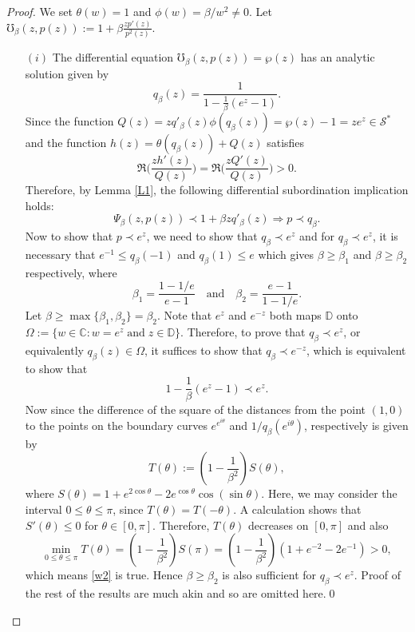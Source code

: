 \documentclass[12pt, reqno]{amsart}
\numberwithin{equation}{section}
\theoremstyle{plain}
\theoremstyle{definition}
\theoremstyle{remark}
\begin{document}
\begin{proof}
	We set $\theta(w)=1$ and $\phi(w)=\beta/{w}^2\neq0$. Let
	$\mho_\beta(z, p(z)):=1+\beta \frac{zp'(z)}{p^2(z)}$.
	\begin{itemize}
		\item [$(i)$] The differential equation $\mho_\beta(z, p(z))=\wp(z)$ has an analytic solution given by
		\begin{equation*}
		q_{\beta}(z)=\frac{1}{1-\frac{1}{\beta}(e^z-1)}.
		\end{equation*}
		Since the function 
		$Q(z)=zq'_{\beta}(z)\phi(q_{\beta}(z))=\wp(z)-1=ze^z\in\mathcal{S}^{*}$ and the function	$h(z)=\theta(q_{\beta}(z))+Q(z)$ satisfies  
		$$\Re\biggl(\frac{zh'(z)}{Q(z)}\biggl)=\Re\biggl(\frac{zQ'(z)}{Q(z)}\biggl)>0.$$ 
		Therefore, by Lemma \ref{L1}, the following differential subordination implication holds:
		$$\Psi_\beta(z, p(z))\prec 1+\beta zq'_{\beta}(z)\Rightarrow p\prec q_{\beta}.$$
		Now to show that $p\prec e^z$, we need to show that $q_{\beta}\prec e^z$ and for $q_{\beta}\prec e^z$, it is necessary that $e^{-1}\leq q_{\beta}(-1)$ and $q_{\beta}(1)\leq e$ which gives $\beta\geq\beta_1$ and $\beta\geq\beta_2$ respectively, where
		$$\beta_1=\frac{1-1/e}{e-1} \quad\text{and}\quad \beta_2=\frac{e-1}{1-1/e}.$$
		Let $\beta\geq\max\{\beta_1,\beta_2\}=\beta_2$. Note that $e^z$ and $e^{-z}$ both maps $\mathbb{D}$ onto $\Omega:=\{w\in \mathbb{C}: w=e^z \;\text{and}\; z\in\mathbb{D} \}$. Therefore, to prove that $q_{\beta} \prec e^z$, or equivalently $q_{\beta}(z) \in \Omega$, it suffices to show that $q_{\beta} \prec e^{-z}$, which is equivalent to show that 
		\begin{equation}\label{w2}
		1-\frac{1}{\beta}(e^z-1) \prec e^z.
		\end{equation}  
		Now since the difference of the square of the distances from the point $(1,0)$ to the points on the boundary curves  $e^{e^{i\theta}}$ and $1/q_{\beta}( e^{i\theta})$, respectively is given by
		$$T(\theta):=\left(1-\frac{1}{{\beta}^2}\right)S(\theta), $$
		where $S(\theta)=1+e^{2\cos\theta}-2e^{\cos\theta}\cos(\sin\theta).$  
		Here, we may consider the interval $0\leq\theta\leq\pi$, since $T(\theta)=T(-\theta)$.
		A calculation shows that $S'(\theta)\leq0$ for $\theta\in[0,\pi]$. Therefore, $T(\theta)$ decreases on $[0,\pi]$ and also $$\min_{0\leq\theta\leq\pi}T(\theta)=\left(1-\frac{1}{{\beta}^2}\right)S(\pi)=\left(1-\frac{1}{{\beta}^2}\right)(1+e^{-2}-2e^{-1})>0,$$
		which means \eqref{w2} is true. Hence $\beta\geq\beta_2$  is also sufficient for $q_{\beta} \prec e^z$. Proof of the rest of the results are much akin and so are omitted here.\qed
	\end{itemize}
\end{proof}
\end{document}
